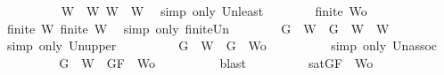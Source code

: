 \begin{isabellebody}
\ \ \ \ \ \ \ \ \isamarkupfalse%
\ {\isacartoucheopen}W{}\ {\isasymsubseteq}\ W{\isacartoucheclose}\ {\isacartoucheopen}W{}\ {\isasymsubseteq}\ W{\isacartoucheclose}\ \isamarkupfalse%
\ {\isacharparenleft}simp\ only{\isacharcolon}\ Un{\isacharunderscore}least{\isacharparenright}\isanewline
\ \ \ \ \ \ \isamarkupfalse%
\ {\isachardoublequoteopen}finite\ {\isacharquery}Wo{\isachardoublequoteclose}\isanewline
\ \ \ \ \ \ \ \ \isamarkupfalse%
\ {\isacartoucheopen}finite\ W{}{\isacartoucheclose}\ {\isacartoucheopen}finite\ W{}{\isacartoucheclose}\ \isamarkupfalse%
\ {\isacharparenleft}simp\ only{\isacharcolon}\ finite{\isacharunderscore}Un{\isacharparenright}\isanewline
\ \ \ \ \ \ \isamarkupfalse%
\ {\isachardoublequoteopen}{\isacharbraceleft}G{\isacharbraceright}\ {\isasymunion}\ W{}\ {\isasymsubseteq}\ {\isacharparenleft}{\isacharbraceleft}G{\isacharbraceright}\ {\isasymunion}\ W{}{\isacharparenright}\ {\isasymunion}\ W{}{\isachardoublequoteclose}\isanewline
\ \ \ \ \ \ \ \ \isamarkupfalse%
\ {\isacharparenleft}simp\ only{\isacharcolon}\ Un{\isacharunderscore}upper{}{\isacharparenright}\isanewline
\ \ \ \ \ \ \isamarkupfalse%
\ \isamarkupfalse%
\ {\isachardoublequoteopen}{\isacharbraceleft}G{\isacharbraceright}\ {\isasymunion}\ W{}\ {\isasymsubseteq}\ {\isacharbraceleft}G{\isacharbraceright}\ {\isasymunion}\ {\isacharquery}Wo{\isachardoublequoteclose}\isanewline
\ \ \ \ \ \ \ \ \isamarkupfalse%
\ {\isacharparenleft}simp\ only{\isacharcolon}\ Un{\isacharunderscore}assoc{\isacharparenright}\isanewline
\ \ \ \ \ \ \isamarkupfalse%
\ \isamarkupfalse%
\ {\isachardoublequoteopen}{\isacharbraceleft}G{\isacharbraceright}\ {\isasymunion}\ W{}\ {\isasymsubseteq}\ {\isacharbraceleft}G{\isacharcomma}F{\isacharbraceright}\ {\isasymunion}\ {\isacharquery}Wo{\isachardoublequoteclose}\isanewline
\ \ \ \ \ \ \ \ \isamarkupfalse%
\ blast\isanewline
\ \ \ \ \ \ \isamarkupfalse%
\ \isamarkupfalse%
\ {}{\isacharcolon}{\isachardoublequoteopen}{\isasymnot}{\isacharparenleft}sat{\isacharparenleft}{\isacharbraceleft}G{\isacharcomma}F{\isacharbraceright}\ {\isasymunion}\ {\isacharquery}Wo{\isacharparenright}{\isacharparenright}{\isachardoublequoteclose}\isanewline
\ \ \ \ \ \ \ \ \isamarkupfalse%

\end{isabellebody}
